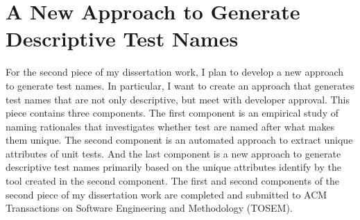 \section{A New Approach to Generate Descriptive Test Names}
\label{sec:generate-names}

For the second piece of my dissertation work, I plan to develop a new approach to generate test names.
%
In particular, I want to create an approach that generates test names that are not only descriptive, but meet with developer approval.
%
This piece contains three components.
%
The first component is an empirical study of naming rationales that investigates whether test are named after what makes them unique.
%
The second component is an automated approach to extract unique attributes of unit tests.
%
And the last component is a new approach to generate descriptive test names primarily based on the unique attributes identify by the tool created in the second component.
The first and second components of the second piece of my dissertation work are completed and submitted to ACM Transactions on Software Engineering and Methodology (TOSEM).






